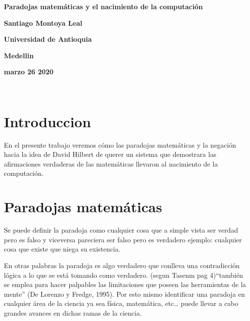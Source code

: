 \documentclass{article}
\begin{document}
\begin{center}
\bf{\sc\Huge Paradojas matemáticas y el nacimiento de la computación}\\
\end{center}
\vspace{120pt}
\begin{center}
\bf{\sc\Huge Santiago Montoya Leal }\\
\end{center}
\vspace{120pt}
\begin{center}
\bf{\sc\Huge Universidad de Antioquia}\\
\end{center}
\vspace{80pt}
\begin{center}
\bf{\sc\Huge Medellin}
\end{center}
\begin{center}
\bf{\sc\Huge marzo 26 2020}\\
\end{center}\
\newpage

\section{Introduccion}
\large

En el presente trabajo veremos cómo las paradojas matemáticas y la negación hacia la idea de David Hilbert de querer un sistema que  demostrara las afirmaciones verdaderas de las matemáticas llevaron al nacimiento de la computación.

\section{Paradojas matemáticas}

\large
Se puede definir la paradoja como cualquier cosa que a simple vista ser verdad pero es falso y viceversa  pareciera ser falso pero es verdadero ejemplo: cualquier cosa que existe que niega su existencia.

\vspace{10pt}
 En otras palabras la paradoja es algo verdadero que conlleva una contradicción lógica a lo que se está tomando como verdadero. (segun Tasenm pag 4)“también se emplea para hacer palpables las limitaciones que poseen las herramientas de la mente” (De Lorenzo y Fredge, 1995). Por esto mismo identificar una paradoja en cualquier área de la ciencia ya sea física, matemática, etc… puede llevar a cabo grandes avances en dichas ramas de la ciencia.
\end{document}
